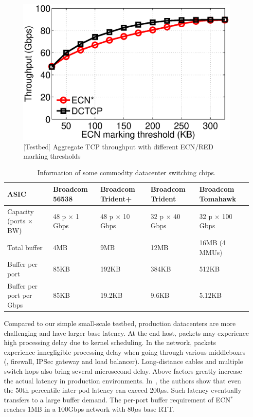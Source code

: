 \begin{figure}[t]
\centering
  \includegraphics[width=0.75\linewidth]{figs/throughput_ecn_threshold.eps}
      \vspace{-1.5mm}
  \caption{[Testbed] Aggregate TCP throughput with different ECN/RED marking thresholds}\label{fig:throughput_ecn_thresh}
    \vspace{-6mm}
\end{figure}
\begin{table}[t]
\small
\centering
\begin{tabular}{|l|l|l|l|l|}
\hline
ASIC & Broadcom 56538 & Broadcom Trident+ & Broadcom Trident \uppercase\expandafter{\romannumeral2} & Broadcom Tomahawk \\\hline
Capacity (ports $\times$ BW) & 48 p $\times$ 1 Gbps & 48 p $\times$ 10 Gbps & 32 p $\times$ 40 Gbps & 32 p $\times$ 100 Gbps \\\hline
Total buffer             & 4MB   & 9MB  & 12MB & 16MB (4 MMUs) \\\hline
Buffer per port          & 85KB  & 192KB  & 384KB & 512KB \\\hline
Buffer per port per Gbps & 85KB  & 19.2KB & 9.6KB & 5.12KB \\\hline
\end{tabular}
\vspace{+1mm}
\caption{Information of some commodity datacenter switching chips.}
\label{tab:chip_buffer}
\vspace{-6mm}
\end{table}

Compared to our simple small-scale testbed, production datacenters are more challenging and have larger base latency. At the end host, packets may experience high processing delay due to kernel scheduling. In the network, packets experience innegligible processing delay when going through various middleboxes (\eg, firewall, IPSec gateway and load balancer). Long-distance cables and multiple switch hops also bring several-microsecond delay. Above factors greatly increase the actual latency in production environments. In~\cite{pingmesh}, the authors show that even the 50th percentile inter-pod latency can exceed 200$\mu$s. Such latency eventually transfers to a large buffer demand. The per-port buffer requirement of ECN$^{*}$ reaches 1MB in a 100Gbps network with 80$\mu$s base RTT.

